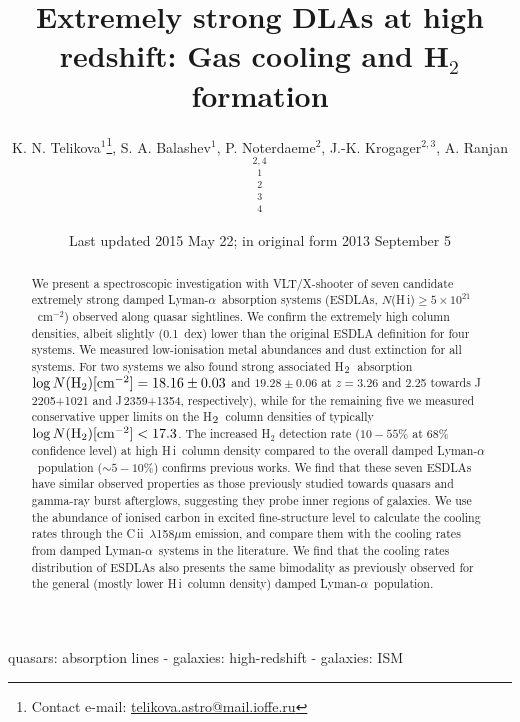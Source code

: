 \documentclass[fleqn,usenatbib,useAMS]{mnras}
\title[Seven new ESDLAs]{Extremely strong DLAs at high redshift: Gas cooling and H$_2$ formation}
\author[K. N. Telikova et al.]{K. N. Telikova$^{1}$\thanks{Contact e-mail: \href{mailto:telikova.astro@mail.ioffe.ru}{telikova.astro@mail.ioffe.ru}}, 
S. A. Balashev$^{1}$, P. Noterdaeme$^{2}$, %
J.-K. Krogager$^{2,3}$, A. Ranjan$^{2,4}$
\\
$^{1}$ \ioffe \\
$^{2}$ \iap \\
$^{3}$ \unige \\
$^{4}$ \kassi
}
\date{Last updated 2015 May 22; in original form 2013 September 5}
\newcommand{\HH}{\mbox{H$\rm _2$}}
\newcommand{\dla}{damped Lyman-$\alpha$}
\newcommand{\HI}{H\,{\sc i}}
\newcommand{\CII}{C\,{\sc ii}}
\begin{document}
\label{firstpage}
\pagerange{\pageref{firstpage}--\pageref{lastpage}}
\maketitle

\begin{abstract}
We present a spectroscopic investigation with VLT/X-shooter of seven candidate extremely strong \dla\ absorption systems
(ESDLAs, $N$(H\,{\sc i})$\ge 5\times 10^{21}$~cm$^{-2}$)
observed along quasar sightlines. 
We confirm the extremely high column densities, albeit slightly (0.1~dex) lower than the original ESDLA definition for four systems. We measured  
low-ionisation metal abundances and dust extinction for all systems. 
For two systems we also found strong associated \HH\ absorption $\log N(\HH)\text{[cm$^{-2}$]}=18.16\pm0.03$ and $19.28\pm0.06$ at $z=3.26$ and 2.25 towards J\,2205+1021 and J\,2359+1354, respectively), while for the remaining five we measured conservative upper limits on the \HH\ column densities of typically $\log N(\HH)\text{[cm$^{-2}$]}<17.3$. The increased H$_2$ detection rate ($10-55$\% at 68\% confidence level) at high \HI\ column density compared to the overall \dla\ population ($\sim 5-10$\%) confirms previous works. 
We find that these seven ESDLAs have similar observed properties as those previously studied towards quasars and gamma-ray burst afterglows, suggesting they probe inner regions of galaxies. We use the abundance of ionised carbon in excited fine-structure level to calculate the cooling rates through the \CII~$\lambda$158$\mu$m emission, and compare them with the cooling rates from \dla\ systems in the literature. We find that the cooling rates distribution of ESDLAs also presents the same bimodality as previously observed for the general (mostly lower \HI\ column density) \dla\ population. 
\end{abstract}

\begin{keywords}
quasars: absorption lines - galaxies: high-redshift - galaxies: ISM
\end{keywords}



\begingroup
\let\clearpage\relax
\endgroup
\newpage
\end{document}
